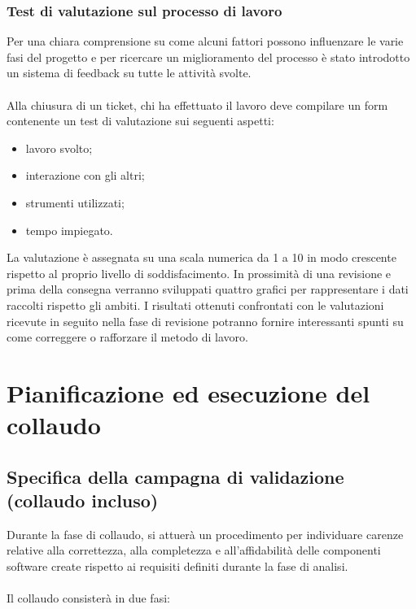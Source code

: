 \subsection{Test di valutazione sul processo di lavoro}
Per una chiara comprensione su come alcuni fattori possono influenzare le varie
fasi del progetto e per ricercare un miglioramento del processo \`e
stato introdotto un sistema di feedback su tutte le attivit\`a svolte.\\ \\
Alla chiusura di un ticket, chi ha effettuato il lavoro deve compilare un form
contenente un test di valutazione sui seguenti aspetti:

\begin{itemize}
\item lavoro svolto;
\item interazione con gli altri;
\item strumenti utilizzati;
\item tempo impiegato.
\end{itemize}

La valutazione \`e assegnata su una scala numerica da 1 a 10 in modo crescente
rispetto al proprio livello di soddisfacimento.
In prossimit\`a di una revisione e prima della consegna verranno sviluppati
quattro grafici per rappresentare i dati raccolti rispetto gli ambiti. 
I risultati ottenuti confrontati con le valutazioni ricevute in seguito nella
fase di revisione potranno fornire interessanti spunti su come correggere o
rafforzare il metodo di lavoro.





\chapter{Pianificazione ed esecuzione del \\collaudo}
\thispagestyle{fancy} %

\section{Specifica della campagna di validazione \\(collaudo incluso)}
Durante la fase di collaudo, si attuer\`a un procedimento per individuare carenze
relative alla correttezza, alla completezza e all'affidabilit\`a delle componenti 
software create rispetto ai requisiti definiti durante la fase di analisi.\\ \\
Il collaudo consister\`a in due fasi: 

